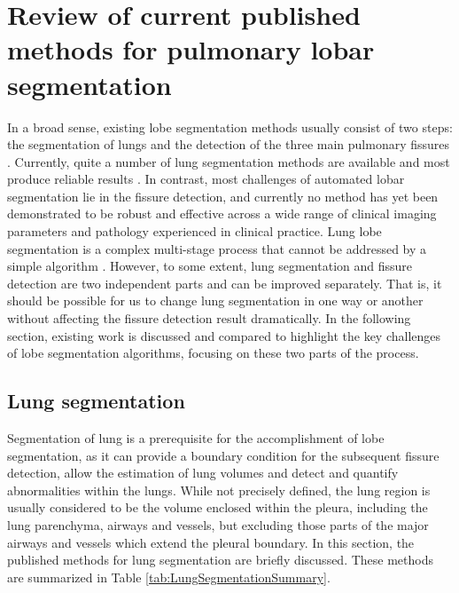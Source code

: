 \section{Review of current published methods for pulmonary lobar segmentation} \label{SegmentationReview}
In a broad sense, existing lobe segmentation methods usually consist of two steps: the segmentation of lungs and the detection of the three main pulmonary fissures \citep{van2013automated}. Currently, quite a number of lung segmentation methods are available and most produce reliable results \citep{hu2001automatic,ukil2005smoothing,sun20063d,pu2008adaptive,wang2009automated}. In contrast, most challenges of automated lobar segmentation lie in the fissure detection, and currently no method has yet been demonstrated to be robust and effective across a wide range of clinical imaging parameters and pathology experienced in clinical practice. Lung lobe segmentation is a complex multi-stage process that cannot be addressed by a simple algorithm \citep{van2013automated,pu2009computational,ukil2009anatomy}. However, to some extent, lung segmentation and fissure detection are two independent parts and can be improved separately. That is, it should be possible for us to change lung segmentation in one way or another without affecting the fissure detection result dramatically. In the following section, existing work is discussed and compared to highlight the key challenges of lobe segmentation algorithms, focusing on these two parts of the process.

\subsection{Lung segmentation}
Segmentation of lung is a prerequisite for the accomplishment of lobe segmentation, as it can provide a boundary condition for the subsequent fissure detection, allow the estimation of lung volumes and detect and quantify abnormalities within the lungs. While not precisely defined, the lung region is usually considered to be the volume enclosed within the pleura, including the lung parenchyma, airways and vessels, but excluding those parts of the major airways and vessels which extend the pleural boundary. In this section, the published methods for lung segmentation are briefly discussed. These methods are summarized in Table \ref{tab:LungSegmentationSummary}.

